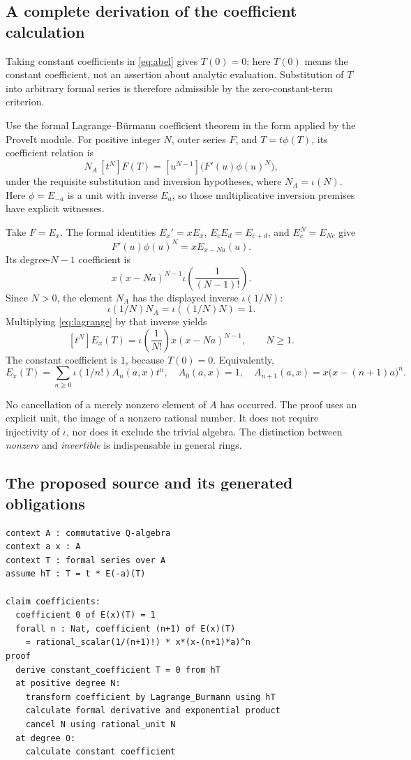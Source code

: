 \documentclass[11pt,letterpaper]{article}
\newcommand{\coeff}[2]{[#1^{#2}]}
\theoremstyle{definition}
\begin{document}
\subsection{A complete derivation of the coefficient calculation}
Taking constant coefficients in \eqref{eq:abel} gives \(T(0)=0\); here \(T(0)\)
means the constant coefficient, not an assertion about analytic evaluation.
Substitution of \(T\) into arbitrary formal series is therefore admissible by the
zero-constant-term criterion.

Use the formal Lagrange--B\"urmann coefficient theorem in the form applied by the
ProveIt module\cite{pabel}. For positive integer \(N\), outer series \(F\), and
\(T=t\phi(T)\), its coefficient relation is
\begin{equation}\label{eq:lagrange}
 N_A\,\coeff tN F(T)=\coeff u{N-1}\bigl(F'(u)\phi(u)^N\bigr),
\end{equation}
under the requisite substitution and inversion hypotheses, where \(N_A=\iota(N)\).
Here \(\phi=E_{-a}\) is a unit with inverse \(E_a\), so those multiplicative
inversion premises have explicit witnesses.

Take \(F=E_x\). The formal identities \(E_x'=xE_x\),
\(E_cE_d=E_{c+d}\), and \(E_c^N=E_{Nc}\) give
\[
 F'(u)\phi(u)^N=xE_{x-Na}(u).
\]
Its degree-\(N-1\) coefficient is
\[
 x(x-Na)^{N-1}\iota\!\left(\frac1{(N-1)!}\right).
\]
Since \(N>0\), the element \(N_A\) has the displayed inverse \(\iota(1/N)\):
\[
 \iota(1/N)N_A=\iota((1/N)N)=1.
\]
Multiplying \eqref{eq:lagrange} by that inverse yields
\begin{equation}\label{eq:abelcoeff}
 \coeff tN E_x(T)
 =\iota\!\left(\frac1{N!}\right)x(x-Na)^{N-1},\qquad N\ge1.
\end{equation}
The constant coefficient is \(1\), because \(T(0)=0\). Equivalently,
\[
 E_x(T)=\sum_{n\ge0}\iota(1/n!)A_n(a,x)t^n,
 \quad A_0(a,x)=1,\quad A_{n+1}(a,x)=x\bigl(x-(n+1)a\bigr)^n.
\]

No cancellation of a merely nonzero element of \(A\) has occurred. The proof uses
an explicit unit, the image of a nonzero rational number. It does not require
injectivity of \(\iota\), nor does it exclude the trivial algebra. The distinction
between \emph{nonzero} and \emph{invertible} is indispensable in general rings.

\subsection{The proposed source and its generated obligations}
\begin{lstlisting}
context A : commutative Q-algebra
context a x : A
context T : formal series over A
assume hT : T = t * E(-a)(T)

claim coefficients:
  coefficient 0 of E(x)(T) = 1
  forall n : Nat, coefficient (n+1) of E(x)(T)
    = rational_scalar(1/(n+1)!) * x*(x-(n+1)*a)^n
proof
  derive constant_coefficient T = 0 from hT
  at positive degree N:
    transform coefficient by Lagrange_Burmann using hT
    calculate formal derivative and exponential product
    cancel N using rational_unit N
  at degree 0:
    calculate constant coefficient
\end{lstlisting}
\end{document}
